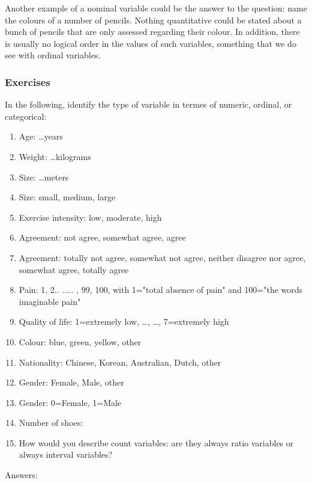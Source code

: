 Another example of a nominal variable could be the answer to the question: name the colours of a number of pencils. Nothing quantitative could be stated about a bunch of pencils that are only assessed regarding their colour. In addition, there is usually no logical order in the values of such variables, something that we do see with ordinal variables.

\subsubsection{Exercises}
In the following, identify the type of variable in termes of numeric, ordinal, or categorical:
\begin{enumerate}
\item Age: \dots years
\item Weight: \dots kilograms
\item Size: \dots meters
\item Size: small, medium, large
\item Exercise intensity: low, moderate, high
\item Agreement: not agree, somewhat agree, agree
\item Agreement: totally not agree, somewhat not agree, neither disagree nor agree, somewhat agree, totally agree
\item Pain: 1, 2.. ..... , 99, 100, with 1="total absence of pain" and 100="the words imaginable pain"
\item Quality of life: 1=extremely low, \dots, \dots, 7=extremely high
\item Colour: blue, green, yellow, other
\item Nationality: Chinese, Korean, Australian, Dutch, other
\item Gender: Female, Male, other
\item Gender: 0=Female, 1=Male
\item Number of shoes:
\item How would you describe count variables: are they always ratio variables or always interval variables?
\end{enumerate}

Answers:

